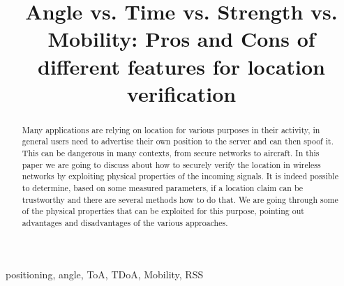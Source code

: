 \documentclass[conference]{IEEEtran}
\begin{document}
\title{Angle vs. Time vs. Strength vs. Mobility: Pros and Cons of different features for location verification}


\maketitle

\begin{abstract}
    Many applications are relying on location for various purposes in their activity, in general users need to advertise their own position to the server and can then spoof it. This can be dangerous in many contexts, from secure networks to aircraft. In this paper we are going to discuss about how to securely verify the location in wireless networks by exploiting physical properties of the incoming signals. It is indeed possible to determine, based on some measured parameters, if a location claim can be trustworthy and there are several methods how to do that. We are going through some of the physical properties that can be exploited for this purpose, pointing out advantages and disadvantages of the various approaches.
\end{abstract}

\begin{IEEEkeywords}
positioning, angle, ToA, TDoA, Mobility, RSS
\end{IEEEkeywords}
\end{document}
